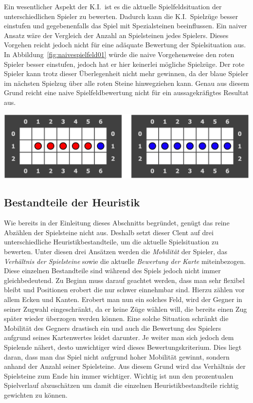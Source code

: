 Ein wesentlicher Aspekt der K.I.\ ist es die aktuelle Spielfeldsituation der unterschiedlichen Spieler zu bewerten.
Dadurch kann die K.I.\ Spielz\"uge besser einstufen und gegebenenfalls das Spiel mit Spezialsteinen beeinflussen.
Ein naiver Ansatz w\"are der Vergleich der Anzahl an Spielsteinen jedes Spielers.
Dieses Vorgehen reicht jedoch nicht f\"ur eine ad\"aquate Bewertung der Spielsituation aus.
In Abbildung~\ref{fig:naivespielfeld01} w\"urde die naive Vorgehensweise den roten Spieler besser einstufen, jedoch hat er hier keinerlei m\"ogliche Spielz\"uge.
Der rote Spieler kann trotz dieser \"Uberlegenheit nicht mehr gewinnen, da der blaue Spieler im n\"achsten Spielzug \"uber alle roten Steine hinwegziehen kann.
Genau aus diesem Grund reicht eine naive Spielfeldbewertung nicht f\"ur ein aussagekr\"afigtes Resultat aus.

\vspace{1em}
\begin{minipage}{\linewidth}
    \centering
    \includegraphics[width=0.6\linewidth]{pics/naive-game-situation}
    \label{fig:naivespielfeld01}
\end{minipage}

\subsection{Bestandteile der Heuristik}\label{subsec:bestandteile-der-heuristik}
Wie bereits in der Einleitung dieses Abschnitts begr\"undet, gen\"ugt das reine Abz\"ahlen der Spielsteine nicht aus.
Deshalb setzt dieser Clent auf drei unterschiedliche Heuristikbestandteile, um die aktuelle Spielsituation zu bewerten.
Unter diesen drei Ans\"atzen werden die \emph{Mobilit\"at} der Spieler, das \emph{Verh\"altnis der Spielsteine} sowie die aktuelle \emph{Bewertung der Karte} miteinbezogen.
Diese einzelnen Bestandteile sind w\"ahrend des Spiels jedoch nicht immer gleichbedeutend.
Zu Beginn muss darauf geachtet werden, dass man sehr flexibel bleibt und Positionen erobert die nur schwer einnehmbar sind.
Hierzu z\"ahlen vor allem Ecken und Kanten.
Erobert man nun ein solches Feld, wird der Gegner in seiner Zugwahl eingeschr\"ankt, da er keine Z\"uge w\"ahlen will, die bereits einen Zug sp\"ater wieder \"uberzogen werden k\"onnen.
Eine solche Situation schr\"ankt die Mobilit\"at des Gegners drastisch ein und auch die Bewertung des Spielers aufgrund seines Kartenwertes leidet darunter.
Je weiter man sich jedoch dem Spielende n\"ahert, desto unwichtiger wird dieses Bewertungskriterium.
Dies liegt daran, dass man das Spiel nicht aufgrund hoher Mobilit\"at gewinnt, sondern anhand der Anzahl seiner Spielsteine.
Aus diesem Grund wird das Verh\"altnis der Spielsteine zum Ende hin immer wichtiger.
Wichtig ist nun den prozentualen Spielverlauf abzusch\"atzen um damit die einzelnen Heuristikbestandteile richtig gewichten zu k\"onnen.

